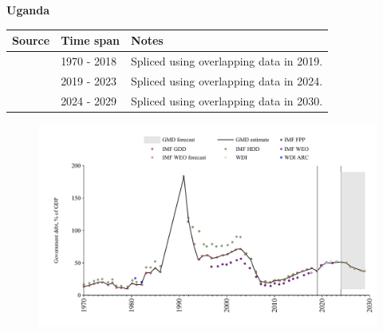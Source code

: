 \documentclass[12pt,a4paper,landscape]{article}
\begin{document}
\begin{adjustbox}{max totalsize={\paperwidth}{\paperheight},center}
\begin{minipage}[t][\textheight][t]{\textwidth}
\vspace*{0.5cm}
{}
\begin{center}
{\Large\bfseries Uganda}
\end{center}
\vspace{0.5cm}
\begin{table}[H]
\centering
\small
\begin{tabular}{|l|l|l|}
\hline
\textbf{Source} & \textbf{Time span} & \textbf{Notes} \\
\hline
\rowcolor{white}\cite{IMF_GDD}& 1970 - 2018 &Spliced using overlapping data in 2019.\\
\rowcolor{lightgray}\cite{IMF_FPP}& 2019 - 2023 &Spliced using overlapping data in 2024.\\
\rowcolor{white}\cite{IMF_WEO_forecast}& 2024 - 2029 &Spliced using overlapping data in 2030.\\
\hline
\end{tabular}
\end{table}
\begin{figure}[H]
\centering
\includegraphics[width=\textwidth,height=0.6\textheight,keepaspectratio]{graphs/UGA_govdebt_GDP.pdf}
\end{figure}
\end{minipage}
\end{adjustbox}
\end{document}
